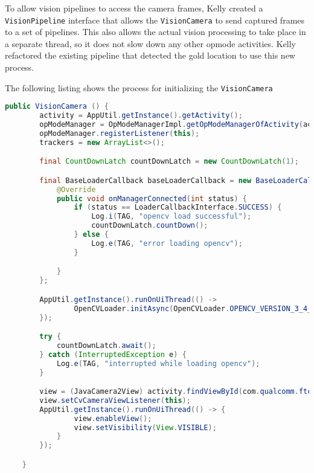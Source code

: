 \documentclass{article}
\begin{document}
To allow vision pipelines to access the camera frames, Kelly created a \texttt{VisionPipeline} interface that allows the \texttt{VisionCamera} to send captured frames to a set of pipelines. This also allows the actual vision processing to take place in a separate thread, so it does not slow down any other opmode activities. Kelly refactored the existing pipeline that detected the gold location to use this new process. 

The following listing shows the process for initializing the \texttt{VisionCamera}

\begin{lstlisting}[language=Java]
    public VisionCamera () {
        activity = AppUtil.getInstance().getActivity();
        opModeManager = OpModeManagerImpl.getOpModeManagerOfActivity(activity);
        opModeManager.registerListener(this);
        trackers = new ArrayList<>();

        final CountDownLatch countDownLatch = new CountDownLatch(1);

        final BaseLoaderCallback baseLoaderCallback = new BaseLoaderCallback(activity) {
            @Override
            public void onManagerConnected(int status) {
                if (status == LoaderCallbackInterface.SUCCESS) {
                    Log.i(TAG, "opencv load successful");
                    countDownLatch.countDown();
                } else {
                    Log.e(TAG, "error loading opencv");
                }

            }
        };

        AppUtil.getInstance().runOnUiThread(() -> 
                OpenCVLoader.initAsync(OpenCVLoader.OPENCV_VERSION_3_4_0, activity, baseLoaderCallback);
        });

        try {
            countDownLatch.await();
        } catch (InterruptedException e) {
            Log.e(TAG, "interrupted while loading opencv");
        }

        view = (JavaCamera2View) activity.findViewById(com.qualcomm.ftcrobotcontroller.R.id.cameraViewId);
        view.setCvCameraViewListener(this);
        AppUtil.getInstance().runOnUiThread(() -> {
                view.enableView();
                view.setVisibility(View.VISIBLE);
            }
        });

    }
\end{lstlisting}
\end{document}
